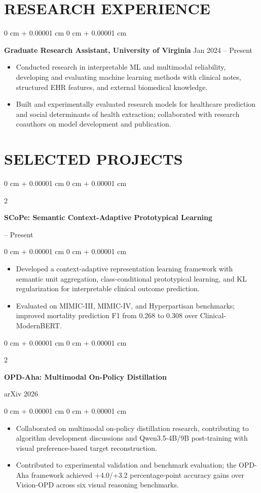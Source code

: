 \documentclass[10pt, letterpaper]{article}
\newenvironment{highlights}{
    \begin{itemize}[
        topsep=0.03 cm,
        parsep=0.03 cm,
        partopsep=0pt,
        itemsep=0pt,
        leftmargin=0 cm + 10pt
    ]
}{
    \end{itemize}
} %
\newenvironment{onecolentry}{
    \begin{adjustwidth}{
        0 cm + 0.00001 cm
    }{
        0 cm + 0.00001 cm
    }
}{
    \end{adjustwidth}
} %
\newenvironment{twocolentry}[2][]{
    \onecolentry
    \def\secondColumn{#2}
    \setcolumnwidth{\fill, 4.5 cm}
    \begin{paracol}{2}
}{
    \switchcolumn \raggedleft \secondColumn
    \end{paracol}
    \endonecolentry
} %
\begin{document}
\section{RESEARCH EXPERIENCE}
\begin{onecolentry}
\textbf{Graduate Research Assistant, University of Virginia} \hfill Jan 2024 -- Present
\begin{highlights}
\item Conducted research in interpretable ML and multimodal reliability, developing and evaluating machine learning methods with clinical notes, structured EHR features, and external biomedical knowledge.
\item Built and experimentally evaluated research models for healthcare prediction and social determinants of health extraction; collaborated with research coauthors on model development and publication.
\end{highlights}
\end{onecolentry}
\section{SELECTED PROJECTS}

\begin{twocolentry}{2026 -- Present}
\textbf{SCoPe: Semantic Context-Adaptive Prototypical Learning}
\end{twocolentry}
\begin{onecolentry}
\begin{highlights}
\item Developed a context-adaptive representation learning framework with semantic unit aggregation, class-conditional prototypical learning, and KL regularization for interpretable clinical outcome prediction.
\item Evaluated on MIMIC-III, MIMIC-IV, and Hyperpartisan benchmarks; improved mortality prediction F1 from 0.268 to 0.308 over Clinical-ModernBERT.
\end{highlights}
\end{onecolentry}
\vspace{0.06 cm}

\begin{twocolentry}{arXiv 2026}
\textbf{OPD-Aha: Multimodal On-Policy Distillation}
\end{twocolentry}
\begin{onecolentry}
\begin{highlights}
\item Collaborated on multimodal on-policy distillation research, contributing to algorithm development discussions and Qwen3.5-4B/9B post-training with visual preference-based target reconstruction.
\item Contributed to experimental validation and benchmark evaluation; the OPD-Aha framework achieved +4.0/+3.2 percentage-point accuracy gains over Vision-OPD across six visual reasoning benchmarks.
\end{highlights}
\end{onecolentry}
\vspace{0.06 cm}
\end{document}
